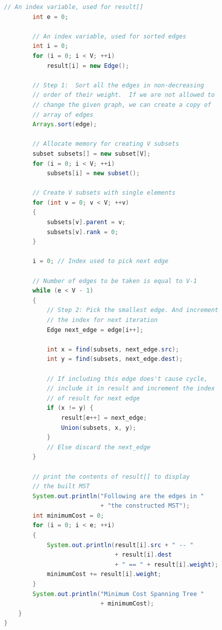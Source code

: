 \documentclass[11pt]{scrartcl}
\begin{document}
\begin{lstlisting}[language=Java]
        // An index variable, used for result[]
        int e = 0;
       
        // An index variable, used for sorted edges
        int i = 0;
        for (i = 0; i < V; ++i)
            result[i] = new Edge();
 
        // Step 1:  Sort all the edges in non-decreasing
        // order of their weight.  If we are not allowed to
        // change the given graph, we can create a copy of
        // array of edges
        Arrays.sort(edge);
 
        // Allocate memory for creating V subsets
        subset subsets[] = new subset[V];
        for (i = 0; i < V; ++i)
            subsets[i] = new subset();
 
        // Create V subsets with single elements
        for (int v = 0; v < V; ++v)
        {
            subsets[v].parent = v;
            subsets[v].rank = 0;
        }
 
        i = 0; // Index used to pick next edge
 
        // Number of edges to be taken is equal to V-1
        while (e < V - 1)
        {
            // Step 2: Pick the smallest edge. And increment
            // the index for next iteration
            Edge next_edge = edge[i++];
 
            int x = find(subsets, next_edge.src);
            int y = find(subsets, next_edge.dest);
 
            // If including this edge does't cause cycle,
            // include it in result and increment the index
            // of result for next edge
            if (x != y) {
                result[e++] = next_edge;
                Union(subsets, x, y);
            }
            // Else discard the next_edge
        }
 
        // print the contents of result[] to display
        // the built MST
        System.out.println("Following are the edges in "
                           + "the constructed MST");
        int minimumCost = 0;
        for (i = 0; i < e; ++i)
        {
            System.out.println(result[i].src + " -- "
                               + result[i].dest
                               + " == " + result[i].weight);
            minimumCost += result[i].weight;
        }
        System.out.println("Minimum Cost Spanning Tree "
                           + minimumCost);
    }
}

\end{lstlisting}
\end{document}
